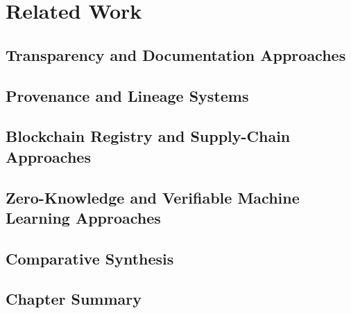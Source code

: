 \chapter{Related Work}
\section{Transparency and Documentation Approaches}
\section{Provenance and Lineage Systems}
\section{Blockchain Registry and Supply-Chain Approaches}
\section{Zero-Knowledge and Verifiable Machine Learning Approaches}
\section{Comparative Synthesis}
\section{Chapter Summary}
